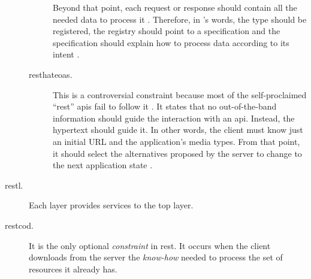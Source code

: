 \begin{description}
\begin{description}
	                        Beyond that point, each request or response should contain all the needed data to process it \citep{wahbe_self-descriptive_2010}.
	                        Therefore, in \citeauthor{fielding_seeking_2006}'s words,
	                        the type should be registered,
	                        the registry should point to a specification and 
	                        the specification should explain how to process data according to its intent \citep{fielding_seeking_2006}. %
	\item[\acf{resthateoas}.] This is a controversial constraint because most of the self-proclaimed ``\ac{rest}'' \acp{api} fail to follow it \citep{moore_hypermedia_2010,house_how_2012}.
	                           It states that no out-of-the-band information should guide the interaction with an \ac{api}.
	                           Instead, the hypertext should guide it.
	                           In other words, the client must know just an initial URL and the application's media types.
	                           From that point, it should select the alternatives proposed by the server to change to the next application state \citep{fielding_rest_2008}.
    \end{description}
 \item[\acf{restl}.] Each layer provides services to the top layer. %
 \item[\acf{restcod}.] It is the only optional \emph{constraint} in \ac{rest}.
		       It occurs when the client downloads from the server the \emph{know-how} needed to process the set of resources it already has.
\end{description}


